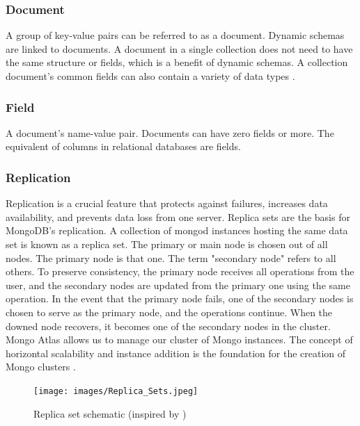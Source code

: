 \subsubsection{Document}

A group of key-value pairs can be referred to as a document. Dynamic schemas are linked to documents. A document in a single collection does not need to have the same structure or fields, which is a benefit of dynamic schemas. A collection document's common fields can also contain a variety of data types \parencite{intellipaat_2016}.

\subsubsection{Field}

A document's name-value pair. Documents can have zero fields or more. The equivalent of columns in relational databases are fields.

\subsubsection{Replication}

Replication is a crucial feature that protects against failures, increases data availability, and prevents data loss from one server.
Replica sets are the basis for MongoDB's replication. A collection of mongod instances hosting the same data set is known as a replica set. The primary or main node is chosen out of all nodes. The primary node is that one. The term "secondary node" refers to all others. To preserve consistency, the primary node receives all operations from the user, and the secondary nodes are updated from the primary one using the same operation. In the event that the primary node fails, one of the secondary nodes is chosen to serve as the primary node, and the operations continue. When the downed node recovers, it becomes one of the secondary nodes in the cluster. Mongo Atlas allows us to manage our cluster of Mongo instances. The concept of horizontal scalability and instance addition is the foundation for the creation of Mongo clusters \parencite{roy_databases_2020}.

\begin{figure}[H]
    \centering
    \caption[Replica set schematic]{Replica set schematic (inspired by \textcite{roy_databases_2020})} \label{fig:Replica Sets}
    \texttt{[image: images/Replica\_Sets.jpeg]}
\end{figure}

